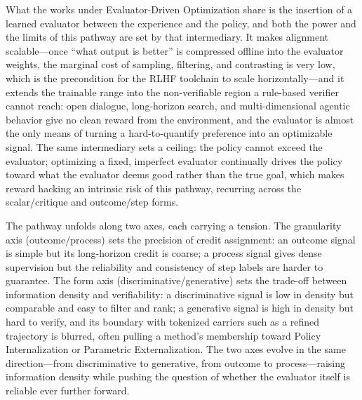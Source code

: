 What the works under Evaluator-Driven Optimization share is the insertion of a learned evaluator between the experience and the policy, and both the power and the limits of this pathway are set by that intermediary. It makes alignment scalable---once ``what output is better'' is compressed offline into the evaluator weights, the marginal cost of sampling, filtering, and contrasting is very low, which is the precondition for the RLHF toolchain to scale horizontally---and it extends the trainable range into the non-verifiable region a rule-based verifier cannot reach: open dialogue, long-horizon search, and multi-dimensional agentic behavior give no clean reward from the environment, and the evaluator is almost the only means of turning a hard-to-quantify preference into an optimizable signal. The same intermediary sets a ceiling: the policy cannot exceed the evaluator; optimizing a fixed, imperfect evaluator continually drives the policy toward what the evaluator deems good rather than the true goal, which makes reward hacking an intrinsic risk of this pathway, recurring across the scalar/critique and outcome/step forms.

The pathway unfolds along two axes, each carrying a tension. The granularity axis (outcome/process) sets the precision of credit assignment: an outcome signal is simple but its long-horizon credit is coarse; a process signal gives dense supervision but the reliability and consistency of step labels are harder to guarantee. The form axis (discriminative/generative) sets the trade-off between information density and verifiability: a discriminative signal is low in density but comparable and easy to filter and rank; a generative signal is high in density but hard to verify, and its boundary with tokenized carriers such as a refined trajectory is blurred, often pulling a method's membership toward Policy Internalization or Parametric Externalization. The two axes evolve in the same direction---from discriminative to generative, from outcome to process---raising information density while pushing the question of whether the evaluator itself is reliable ever further forward.

